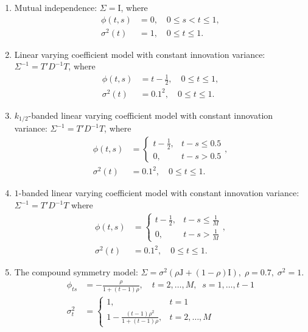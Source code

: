 \documentclass[12pt]{article}
\newcommand*\needsparaphrased{\color{red}}
\theoremstyle{definition}
\begin{document}
\begin{enumerate} 
\item\label{item:cov-type-1} Mutual independence: $\Sigma = \mathrm{I}$, where 
\begin{align*}
\phi\left(t,s\right) &= 0, \quad 0 \le s < t \le 1,\\ 
\sigma^2\left(t\right) &= 1, \quad 0 \le t \le 1.
\end{align*}
\item \label{item:cov-type-2} Linear varying coefficient model with constant innovation variance: $\Sigma^{-1} = T' D^{-1} T$, where 
\begin{align*}
\phi\left(t,s\right) &= t - \frac{1}{2},  \quad 0 \le t \le 1, \\
\sigma^2\left(t\right) &= 0.1^2,  \quad 0 \le t \le 1.
\end{align*}
{\needsparaphrased{TODO: How do we describe the structures for models II-V in terms of continuous $t\in\left[0,1\right]$? }}
\item \label{item:cov-type-3} $k_{1/2}$-banded linear varying coefficient model with constant innovation variance: $\Sigma^{-1} = T' D^{-1} T$, where
\begin{align*}
\phi\left(t,s\right) &= \left\{\begin{array}{ll} t - \frac{1}{2}, & t - s \le 0.5\\ 
0, & t - s > 0.5\end{array}\right.,\\
\sigma^2\left(t\right) &= 0.1^2, \quad 0 \le t \le 1.
\end{align*}
\item \label{item:cov-type-4} $1$-banded linear varying coefficient model with constant innovation variance: $\Sigma^{-1} = T' D^{-1} T$ where 
\begin{align*}
\phi\left(t,s\right) &= \left\{\begin{array}{ll} t - \frac{1}{2}, & t - s \le \frac{1}{M}\\ 0, & t - s > \frac{1}{M}\end{array}\right.,\\
\sigma^2\left(t\right) &= 0.1^2, \quad 0 \le t \le 1.
\end{align*}
\item \label{item:cov-type-5} The compound symmetry model: $\Sigma = \sigma^2\left(\rho \mathrm{J} + \left(1-\rho\right)\mathrm{I}\right),\; \rho=0.7,\;\sigma^2=1$. 
\begin{align*}
\phi_{ts} &= -\frac{\rho}{1 + \left(t-1\right)\rho}, \quad t = 2, \dots, M,\;\; s = 1, \dots, t-1\\
\sigma_t^2 &= \left\{\begin{array}{ll} 1, & t = 1\\ 1 -\frac{\left(t-1\right)\rho^2}{1 + \left(t-1\right)\rho}, & t = 2, \dots, M \end{array}\right.
\end{align*}
\end{enumerate}
\end{document}
